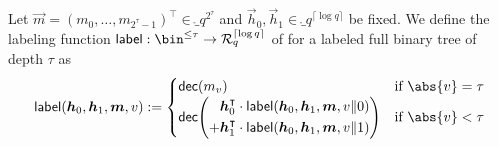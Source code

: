 \begin{definition}\label{def:label}
  Let $\vec{m}=(m_{0},\dots,m_{{2^{\tau}}-1})^\intercal\in\ring_q^{2^{\tau}}$ and $\vec{h}_0,\vec{h}_1 \in \ring_q^{\lceil\log q\rceil}$ be fixed.
  We define the labeling function $\lbl : \bin^{\leq \tau} \to \ring_q^{\lceil \log q \rceil}$ of for a labeled full binary tree of depth $\tau$ as
  \[
    \lbl(\vec{h}_0,\vec{h}_1,\vec{m},v) := \begin{cases} \decomp(m_{v}) & \text{if } \abs{v}=\tau\\ \decomp\mleft(\begin{aligned}\vec{h}_0^\intercal \cdot\lbl(\vec{h}_0,\vec{h}_1,\vec{m},v\Vert 0)\\ + \vec{h}_1^\intercal \cdot\lbl(\vec{h}_0,\vec{h}_1,\vec{m},v\Vert 1)\end{aligned}\mright)& \text{if } \abs{v}< \tau\end{cases}
  \]
\end{definition}

